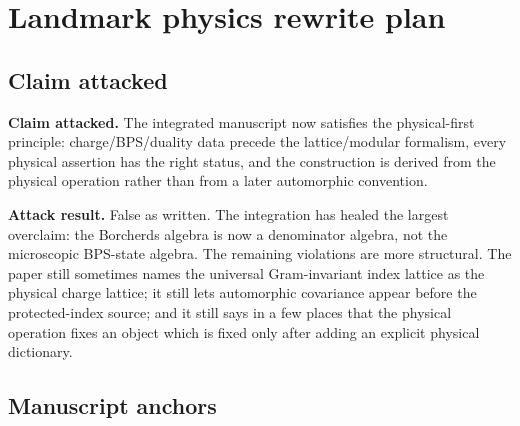 \section{Landmark physics rewrite plan}
\label{sec:landmark-physics-rewrite-plan}

\subsection{Claim attacked}

\textbf{Claim attacked.}  The integrated manuscript now satisfies the
physical-first principle: charge/BPS/duality data precede the
lattice/modular formalism, every physical assertion has the right status,
and the construction is derived from the physical operation rather than
from a later automorphic convention.

\textbf{Attack result.}  False as written.  The integration has healed the
largest overclaim: the Borcherds algebra is now a denominator algebra, not
the microscopic BPS-state algebra.  The remaining violations are more
structural.  The paper still sometimes names the universal
Gram-invariant index lattice as the physical charge lattice; it still
lets automorphic covariance appear before the protected-index source; and
it still says in a few places that the physical operation fixes an object
which is fixed only after adding an explicit physical dictionary.

\subsection{Manuscript anchors}

